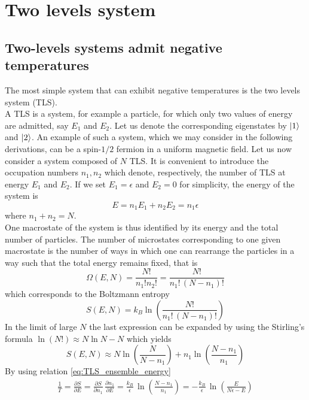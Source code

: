 \chapter{Two levels system}
\label{ch:TLS}

\section{Two-levels systems admit negative temperatures}
The most simple system that can exhibit negative temperatures is the two levels system (TLS). \\
A TLS is a system, for example a particle, for which only two values of energy are admitted, say $E_1$ and $E_2$. Let us denote the 
corresponding eigenstates by $\left| 1 \right\rangle$ and $\left| 2 \right\rangle$. An example of such a system, which we may consider in the following derivations, can be a spin-$1/2$ fermion in a uniform magnetic field.
Let us now consider a system composed of $N$ TLS. It is convenient to introduce the occupation numbers $n_1, n_2$ which denote,
respectively, the number of TLS at energy $E_1$ and $E_2$. If we set $E_1=\epsilon$ and $E_2=0$ for simplicity, the energy of the system is
\begin{equation}
    E = n_1 E_1 + n_2 E_2 = n_1\epsilon
    \label{eq:TLS_ensemble_energy}
\end{equation}
where $n_1 + n_2 = N$. \\
One macrostate of the system is thus identified by its energy and the total number of particles. The number of microstates corresponding 
to one given macrostate is the number of ways in which one can rearrange the particles in a way such that the total energy remains fixed, that is 
\begin{equation*}
    \Omega(E, N) = \frac{N!}{n_1!n_2!} = \frac{N!}{n_1! \, (N-n_1)!}
\end{equation*}
which corresponds to the Boltzmann entropy 
\begin{equation}
    S(E, N) = k_B\ln\left(\frac{N!}{n_1! \, (N-n_1)!}\right)
    \label{eq:TLS_entropy_N}
\end{equation}
In the limit of large $N$ the last expression can be expanded by using the Stirling's formula $\ln(N!) \approx N\ln N - N$ which yields 
\begin{equation}
    S(E, N) \approx N \ln \left(\frac{N}{N-n_1}\right) + n_1 \ln\left(\frac{N-n_1}{n_1}\right)
    \label{eq:TLS_entropy_N_approx}
\end{equation}
By using relation \ref{eq:TLS_ensemble_energy}
\begin{equation}\begin{gathered}
    \frac{1}{T} = \frac{\partial S}{\partial E} = \frac{\partial S}{\partial n_1} \, \frac{\partial n_1}{\partial E} =
    \frac{k_B}{\epsilon} \, \ln\left(\frac{N - n_1}{n_1}\right) = -\frac{k_B}{\epsilon} \, \ln\left(\frac{E}{N\epsilon - E}\right)
\end{gathered} 
\label{eq:T_tls} 
\end{equation}
